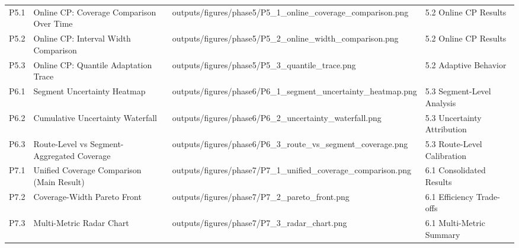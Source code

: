 \begin{table}
\begin{tabular}{lp{5cm}p{5.5cm}p{3.5cm}}
P5.1 & Online CP: Coverage Comparison Over Time & outputs/figures/phase5/P5_1_online_coverage_comparison.png & 5.2 Online CP Results \\
P5.2 & Online CP: Interval Width Comparison & outputs/figures/phase5/P5_2_online_width_comparison.png & 5.2 Online CP Results \\
P5.3 & Online CP: Quantile Adaptation Trace & outputs/figures/phase5/P5_3_quantile_trace.png & 5.2 Adaptive Behavior \\
P6.1 & Segment Uncertainty Heatmap & outputs/figures/phase6/P6_1_segment_uncertainty_heatmap.png & 5.3 Segment-Level Analysis \\
P6.2 & Cumulative Uncertainty Waterfall & outputs/figures/phase6/P6_2_uncertainty_waterfall.png & 5.3 Uncertainty Attribution \\
P6.3 & Route-Level vs Segment-Aggregated Coverage & outputs/figures/phase6/P6_3_route_vs_segment_coverage.png & 5.3 Route-Level Calibration \\
P7.1 & Unified Coverage Comparison (Main Result) & outputs/figures/phase7/P7_1_unified_coverage_comparison.png & 6.1 Consolidated Results \\
P7.2 & Coverage-Width Pareto Front & outputs/figures/phase7/P7_2_pareto_front.png & 6.1 Efficiency Trade-offs \\
P7.3 & Multi-Metric Radar Chart & outputs/figures/phase7/P7_3_radar_chart.png & 6.1 Multi-Metric Summary \\
\bottomrule
\end{tabular}
\end{table}


